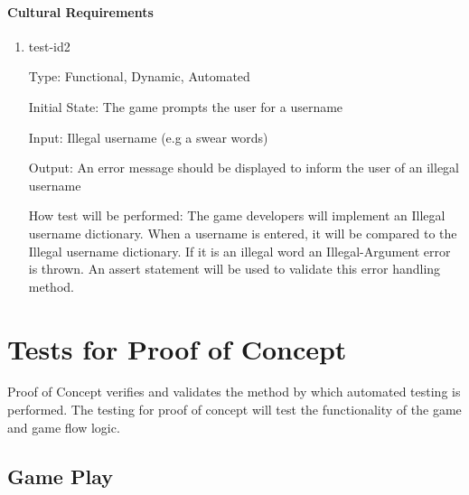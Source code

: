 \documentclass[12pt, titlepage]{article}
\begin{document}
\paragraph{Cultural Requirements}
\begin{enumerate}
\item{test-id2\\}

Type: Functional, Dynamic, Automated 
					
Initial State: The game prompts the user for a username
					
Input: Illegal username (e.g a swear words)
					
Output: An error message should be displayed to inform the user of an illegal username
					
How test will be performed: The game developers will implement an Illegal username dictionary. When a username is entered, it will be compared to the Illegal username dictionary. If it is an illegal word an Illegal-Argument error is thrown. An assert statement will be used to validate this error handling method.

\end{enumerate}



\section{Tests for Proof of Concept}

Proof of Concept verifies and validates the method by which automated testing is performed. The testing for proof of concept will test the functionality of the game and game flow logic. 

\subsection{Game Play}
\end{document}

